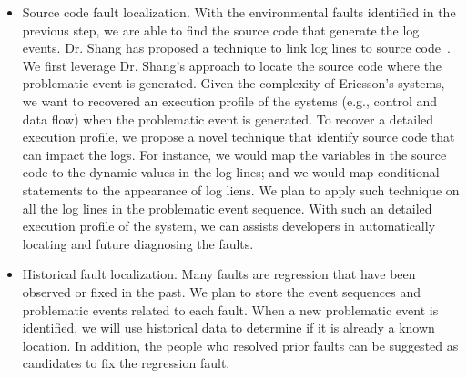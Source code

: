 \begin{enumerate}
\begin{itemize}
		\item Source code fault localization. With the environmental faults identified in the previous step, we are able to find the source code that generate the log events. Dr. Shang has proposed a technique to link log lines to source code~\cite{Shang:2014:ULL:2705615.2706065}. We first leverage Dr. Shang's approach to locate the source code where the problematic event is generated. Given the complexity of Ericsson's systems, we want to recovered an execution profile of the systems (e.g., control and data flow) when the problematic event is generated. To recover a detailed execution profile, we propose a novel technique that identify source code that can impact the logs. For instance, we would map the variables in the source code to the dynamic values in the log lines; and we would map conditional statements to the appearance of log liens. We plan to apply such technique on all the log lines in the problematic event sequence. With such an detailed execution profile of the system, we can assists developers in automatically locating and future diagnosing the faults.
		
		\item Historical fault localization. Many faults are regression that have been observed or fixed in the past. We plan to store the event sequences and problematic events related to each fault. When a new problematic event is identified, we will use historical data to determine if it is already a known location. In addition, the people who resolved prior faults can be suggested as candidates to fix the regression fault.
		
	\end{itemize}
\end{enumerate}

